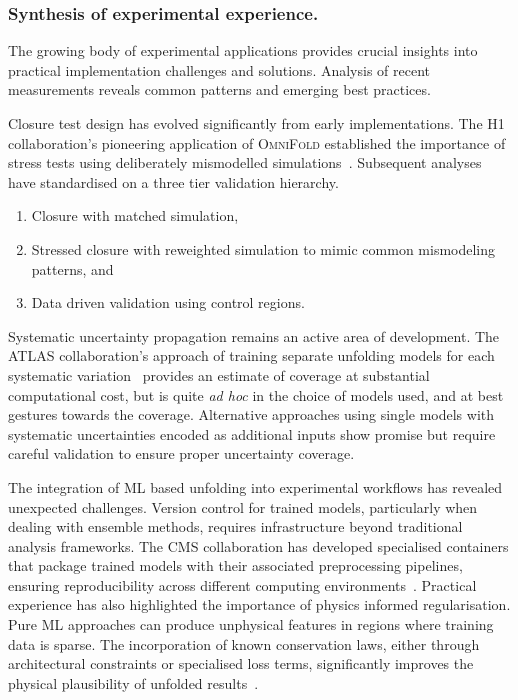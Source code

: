         \subsubsection{Synthesis of experimental experience.}
        The growing body of experimental applications provides crucial insights into practical implementation challenges and solutions.
        Analysis of recent measurements reveals common patterns and emerging best practices.

        Closure test design has evolved significantly from early implementations.
        The H1 collaboration's pioneering application of \textsc{OmniFold} established the importance of stress tests using deliberately mismodelled simulations~\cite{collaboration_measurement_2022}.
        Subsequent analyses have standardised on a three tier validation hierarchy.
        \begin{enumerate}
            \item Closure with matched simulation,
            \item Stressed closure with reweighted simulation to mimic common mismodeling patterns, and
            \item Data driven validation using control regions.
        \end{enumerate}
        
        Systematic uncertainty propagation remains an active area of development.
        The ATLAS collaboration's approach of training separate unfolding models for each systematic variation~\cite{collaboration_measurement_2025} provides an estimate of coverage at substantial computational cost, but is quite \textit{ad hoc} in the choice of models used, and at best gestures towards the coverage.
        Alternative approaches using single models with systematic uncertainties encoded as additional inputs show promise but require careful validation to ensure proper uncertainty coverage.
        
        The integration of ML based unfolding into experimental workflows has revealed unexpected challenges.
        Version control for trained models, particularly when dealing with ensemble methods, requires infrastructure beyond traditional analysis frameworks.
        The CMS collaboration has developed specialised containers that package trained models with their associated preprocessing pipelines, ensuring reproducibility across different computing environments~\cite{CMS:2024onh}.
        Practical experience has also highlighted the importance of physics informed regularisation.
        Pure ML approaches can produce unphysical features in regions where training data is sparse.
        The incorporation of known conservation laws, either through architectural constraints or specialised loss terms, significantly improves the physical plausibility of unfolded results~\cite{Spinner2024Lorentz-EquivariantPhysics}.


